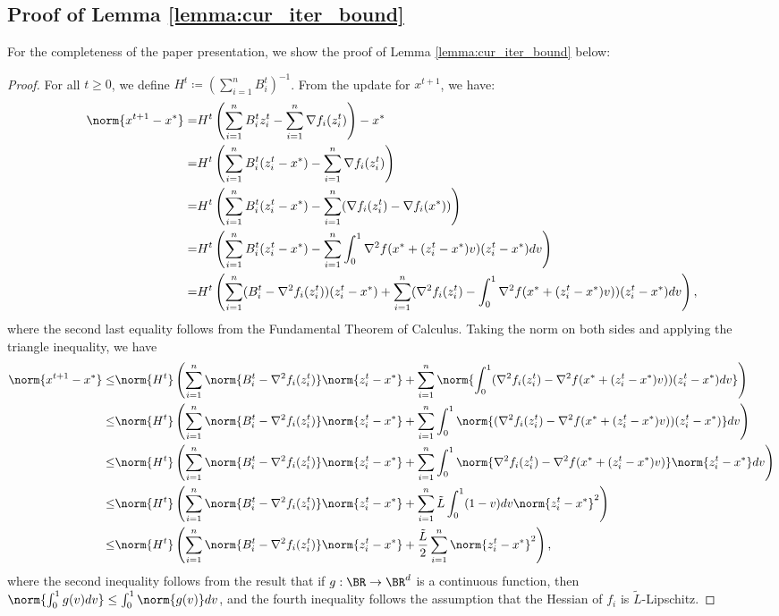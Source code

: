 \subsection{Proof of Lemma \ref{lemma:cur_iter_bound}}
For the completeness of the paper presentation, we show the proof of Lemma \ref{lemma:cur_iter_bound} below:
\begin{proof}
    For all $t \geq 0$, we define $H^t \coloneqq (\sum_{i=1}^n B_i^t)^{-1}$. From the update for $x^{t+1}$, we have:
    \begin{align*}
        \norm{x^{t+1} - x^*} =& H^t \left( \sum_{i=1}^n B_i^t z_i^t - \sum_{i=1}^n \nabla f_i(z_i^t) \right) - x^* \\
         = & H^{t} \left( \sum_{i=1}^n B_i^{t} (z_i^t - x^*) - \sum_{i=1}^n \nabla f_i(z_i^t) \right) \\
         = & H^{t} \left( \sum_{i=1}^n B_i^{t} (z_i^t - x^*) - \sum_{i=1}^n (\nabla f_i(z_i^t) - \nabla f_i(x^*))\right) \\
        = &  H^{t} \left( \sum_{i=1}^n B_i^{t} (z_i^t - x^*) - \sum_{i=1}^n \int_0^1\nabla^2 f(x^* + (z_i^t - x^*)v) (z_i^t - x^*) d v \right) \\
        = &  H^{t} \left( \sum_{i=1}^n (B_i^{t} - \nabla^2 f_i(z_i^t)) (z_i^t - x^*) + \sum_{i=1}^n (\nabla^2 f_i (z_i^t) - \int_0^1\nabla^2 f(x^* + (z_i^t - x^*)v) ) (z_i^t - x^*) d v \right),
    \end{align*}
    where the second last equality follows from the Fundamental Theorem of Calculus. Taking the norm on both sides and applying the triangle inequality, we have
    \begin{align*}
        \norm{x^{t+1} - x^*} \leq & \norm{H^{t}} \left( \sum_{i=1}^n \norm{B_i^{t} - \nabla^2 f_i(z_i^t)} \norm{z_i^t - x^*} + \sum_{i=1}^n \norm{\int_0^1 (\nabla^2 f_i (z_i^t) - \nabla^2 f(x^* + (z_i^t - x^*)v))  (z_i^t - x^*) d v } \right) \\
        \leq & \norm{H^{t}} \left( \sum_{i=1}^n \norm{B_i^{t} - \nabla^2 f_i(z_i^t)} \norm{z_i^t - x^*} + \sum_{i=1}^n \int_0^1 \norm{(\nabla^2 f_i (z_i^t) - \nabla^2 f(x^* + (z_i^t - x^*)v))  (z_i^t - x^*)} d v   \right) \\
        \leq & \norm{H^{t}} \left( \sum_{i=1}^n \norm{B_i^{t} - \nabla^2 f_i(z_i^t)} \norm{z_i^t - x^*} + \sum_{i=1}^n \int_0^1 \norm{\nabla^2 f_i (z_i^t) - \nabla^2 f(x^* + (z_i^t - x^*)v)}  \norm{z_i^t - x^*} d v   \right) \\
        \leq & \norm{H^{t}} \left( \sum_{i=1}^n \norm{B_i^{t} - \nabla^2 f_i(z_i^t)} \norm{z_i^t - x^*} + \sum_{i=1}^n \Tilde{L} \int_0^1 (1 - v) d v \norm{z_i^t - x^*}^2   \right) \\
        \leq & \norm{H^{t}} \left( \sum_{i=1}^n \norm{B_i^{t} - \nabla^2 f_i(z_i^t)} \norm{z_i^t - x^*} + \frac{\Tilde{L}}{2} \sum_{i=1}^n   \norm{z_i^t - x^*}^2   \right),
    \end{align*}
    where the second inequality follows from the result that if $g: \BR \to \BR^d$ is a continuous function, then $\norm{\int_0^1 g(v) d v} \leq \int_0^1 \norm{g(v)} d v$, and the fourth inequality follows the assumption that the Hessian of $f_i$ is $\tilde{L}$-Lipschitz.
\end{proof}

